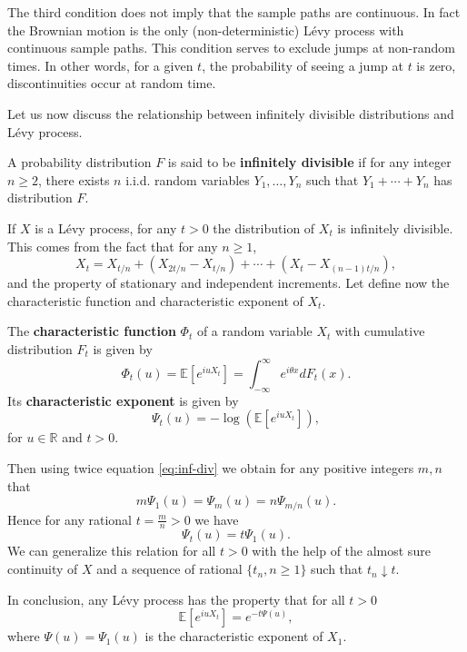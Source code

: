 The third condition does not imply that the sample paths are continuous. In fact the Brownian motion is the only (non-deterministic) L\'evy process with continuous sample paths. This condition serves to exclude jumps at non-random times. In other words, for a given $t$, the probability of seeing a jump at $t$ is zero, discontinuities occur at random time.

Let us now discuss the relationship between infinitely divisible distributions and L\'evy process.

\begin{defn}
A probability distribution $F$ is said to be \textbf{infinitely divisible} if for any integer $n\geq 2$, there exists $n$ i.i.d. random variables $Y_1,\ldots,Y_n$ such that $Y_1+\cdots+Y_n$ has distribution $F$.
\end{defn}
If $X$ is a L\'evy process, for any $t>0$ the distribution of $X_t$ is infinitely divisible. This comes from the fact that for any $n \geq 1$,
\begin{equation}\label{eq:inf-div}
X_t = X_{t/n} + (X_{2t/n}-X_{t/n}) + \cdots + (X_t - X_{(n-1)t/n}),
\end{equation}
and the property of stationary and independent increments. Let define now the characteristic function and characteristic  exponent of $X_t$.

\begin{defn}
The \textbf{characteristic function} $\Phi_t$ of a random variable $X_t$ with cumulative distribution $F_t$ is given by
$$\Phi_t(u) = \mathbb{E}\left[e^{iu X_t}\right]=\int_{-\infty}^{\infty}e^{i\theta x}dF_t(x).$$
Its \textbf{characteristic exponent} is given by
$$\Psi_t(u) = -\log\left(\mathbb{E}\left[e^{iu X_t}\right]\right),$$
for $u \in\mathbb{R}$ and $t>0$.
\end{defn}

 Then using twice equation \eqref{eq:inf-div} we obtain for any positive integers $m,n$ that
$$m\Psi_1(u) = \Psi_m(u) = n \Psi_{m/n}(u).$$
Hence for any rational $t=\frac{m}{n}>0$ we have
$$\Psi_t(u) = t\Psi_1(u).$$
We can generalize this relation for all $t>0$ with the help of the almost sure continuity of $X$ and a sequence of rational $\{t_n, n\geq 1\}$ such that $t_n\downarrow t$.

In conclusion, any L\'evy process has the property that for all $t>0$
$$\mathbb{E}\left[e^{iu X_t}\right] = e^{-t\Psi(u)},$$
where $\Psi(u) = \Psi_1(u)$ is the characteristic exponent of $X_1$.

